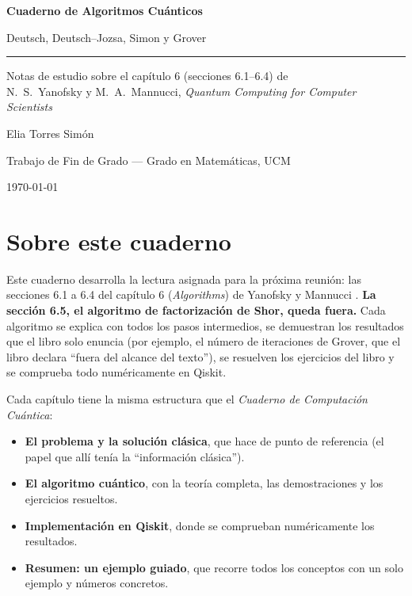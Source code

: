 \documentclass[11pt, a4paper, twoside, openright]{report}
\begin{document}
\begin{titlepage}
\centering
\vspace*{4cm}
{\Huge\bfseries Cuaderno de Algoritmos Cuánticos\par}
\vspace{1cm}
{\Large Deutsch, Deutsch--Jozsa, Simon y Grover\par}
\vspace{1cm}
{\color{rosa!60}\rule{0.5\textwidth}{1pt}\par}
\vspace{1cm}
{\large Notas de estudio sobre el capítulo 6 (secciones 6.1--6.4) de\\[2mm] N.~S.~Yanofsky y M.~A.~Mannucci, \textit{Quantum Computing for Computer Scientists}\par}
\vfill
{\large Elia Torres Simón\par}
\vspace{0.5cm}
{\large Trabajo de Fin de Grado --- Grado en Matemáticas, UCM\par}
\vspace{0.5cm}
{\large \today\par}
\end{titlepage}

\cleardoublepage
\thispagestyle{empty}
\section*{Sobre este cuaderno}

\noindent Este cuaderno desarrolla la lectura asignada para la próxima reunión: las secciones 6.1 a 6.4 del capítulo 6 (\textit{Algorithms}) de Yanofsky y Mannucci \cite{yanofsky2008}. \textbf{La sección 6.5, el algoritmo de factorización de Shor, queda fuera.} Cada algoritmo se explica con todos los pasos intermedios, se demuestran los resultados que el libro solo enuncia (por ejemplo, el número de iteraciones de Grover, que el libro declara ``fuera del alcance del texto''), se resuelven los ejercicios del libro y se comprueba todo numéricamente en Qiskit.

\noindent Cada capítulo tiene la misma estructura que el \textit{Cuaderno de Computación Cuántica}:
\begin{itemize}
    \item \textbf{El problema y la solución clásica}, que hace de punto de referencia (el papel que allí tenía la ``información clásica'').
    \item \textbf{El algoritmo cuántico}, con la teoría completa, las demostraciones y los ejercicios resueltos.
    \item \textbf{Implementación en Qiskit}, donde se comprueban numéricamente los resultados.
    \item \textbf{Resumen: un ejemplo guiado}, que recorre todos los conceptos con un solo ejemplo y números concretos.
\end{itemize}
\end{document}

